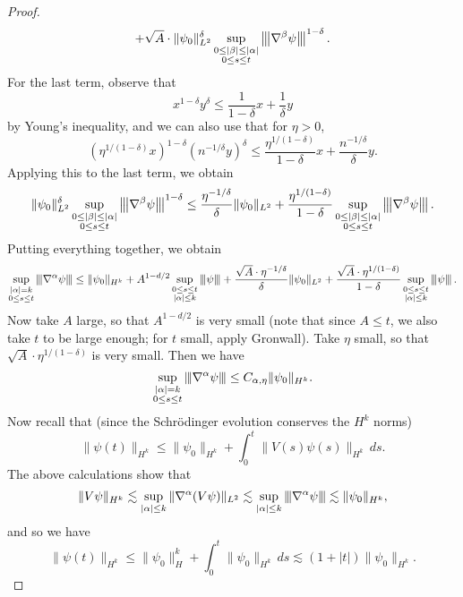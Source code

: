 \begin{proof}
\[    + \sqrt{A} \cdot \|\psi_0\|_{L^2}^\delta \sup_{\substack{0 \le |\beta| \le |\alpha| \\ 0 \le s \le t}} \left\lvert\hspace{-1 pt}\left\lvert\hspace{-1 pt}\left\lvert {\nabla^\beta \psi}\right\lvert\hspace{-1 pt}\right\lvert\hspace{-1 pt}\right\lvert^{1 - \delta}.
  \]
  For the last term, observe that
  \[
    x^{1 - \delta} y^\delta \le \frac{1}{1 - \delta} x + \frac{1}{\delta} y
  \]
  by Young's inequality, and we can also use that
  for $\eta > 0$,
  \[
  \left(\eta^{1 / (1 - \delta)} x\right)^{1 - \delta}
  \left(n^{-1 / \delta} y\right)^\delta
  \le \frac{\eta^{1 / (1 - \delta)}}{1 - \delta} x + 
  \frac{n^{-1 / \delta}}{\delta} y.
  \]
  Applying this to the last term, we obtain
  \[
    \|\psi_0\|_{L^2}^\delta \sup_{\substack{0 \le |\beta| \le |\alpha| \\ 0 \le s \le t}} \left\lvert\hspace{-1 pt}\left\lvert\hspace{-1 pt}\left\lvert {\nabla^\beta \psi}\right\lvert\hspace{-1 pt}\right\lvert\hspace{-1 pt}\right\lvert^{1 - \delta}
    \le \frac{\eta^{-1 / \delta}}{\delta} \|\psi_0\|_{L^2}
    + \frac{\eta^{1 / (1 - \delta)}}{1 - \delta}
    \sup_{\substack{0 \le |\beta| \le |\alpha| \\ 0 \le s \le t}} \left\lvert\hspace{-1 pt}\left\lvert\hspace{-1 pt}\left\lvert {\nabla^\beta \psi}\right\lvert\hspace{-1 pt}\right\lvert\hspace{-1 pt}\right\lvert.
  \]
  Putting everything together, we obtain
  \[
    \sup_{\substack{|\alpha| = k \\ 0 \le s \le t}}
    \left\lvert\hspace{-1 pt}\left\lvert\hspace{-1 pt}\left\lvert {\nabla^\alpha \psi}\right\lvert\hspace{-1 pt}\right\lvert\hspace{-1 pt}\right\lvert
    \le \|\psi_0\|_{H^k} + A^{1 - d / 2} \sup_{\substack{0 \le s \le t \\ |\alpha| \le k}} \left\lvert\hspace{-1 pt}\left\lvert\hspace{-1 pt}\left\lvert {\psi}\right\lvert\hspace{-1 pt}\right\lvert\hspace{-1 pt}\right\lvert
    + \frac{\sqrt{A} \cdot \eta^{-1 / \delta}}{\delta} \|\psi_0\|_{L^2}
    + \frac{\sqrt{A} \cdot \eta^{1 / (1 - \delta)}}{1 - \delta} \sup_{\substack{0 \le s \le t \\ |\alpha| \le k}} \left\lvert\hspace{-1 pt}\left\lvert\hspace{-1 pt}\left\lvert {\psi}\right\lvert\hspace{-1 pt}\right\lvert\hspace{-1 pt}\right\lvert.
  \]
  Now take $A$ large, so that $A^{1 - d / 2}$ is very
  small (note that since $A \le t$, we also take
  $t$ to be large enough; for $t$ small,
  apply Gronwall). Take $\eta$ small, so that $\sqrt{A} \cdot \eta^{1 / (1 - \delta)}$
  is very small. Then we have
  \[
    \sup_{\substack{|\alpha| = k \\ 0 \le s \le t}}
    \left\lvert\hspace{-1 pt}\left\lvert\hspace{-1 pt}\left\lvert {\nabla^\alpha \psi}\right\lvert\hspace{-1 pt}\right\lvert\hspace{-1 pt}\right\lvert
    \le C_{\alpha, \eta} \|\psi_0\|_{H^k}.
  \]
  Now recall that (since the Schr\"odinger evolution
  conserves the $H^k$ norms)
  \[
    \|\psi(t)\|_{H^k}
    \le \|\psi_0\|_{H^k} + \int_0^t \|V(s) \psi(s)\|_{H^k}\, ds.
  \]
  The above calculations show that
  \[
    \|V\psi\|_{H^k} \lesssim
    \sup_{|\alpha| \le k} \|\nabla^\alpha (V\psi)\|_{L^2}
    \lesssim \sup_{|\alpha| \le k} \left\lvert\hspace{-1 pt}\left\lvert\hspace{-1 pt}\left\lvert {\nabla^\alpha \psi}\right\lvert\hspace{-1 pt}\right\lvert\hspace{-1 pt}\right\lvert
    \lesssim \|\psi_0\|_{H^k},
  \]
  and so we have
  \[
    \|\psi(t)\|_{H^k}
    \le \|\psi_0\|_H^k + \int_0^t \|\psi_0 \|_{H^k}\, ds
    \lesssim (1 + |t|) \|\psi_0\|_{H^k}.
\]
\end{proof}
